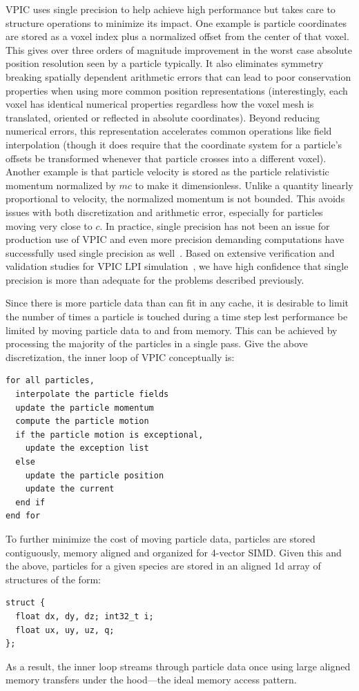 \documentclass[journal,twoside]{IEEEtran}
\begin{document}
VPIC uses single precision to help achieve high performance but takes
care to structure operations to minimize its impact.  One example is
particle coordinates are stored as a voxel index plus a normalized
offset from the center of that voxel.  This gives over three orders of
magnitude improvement in the worst case absolute position resolution
seen by a particle typically.  It also eliminates symmetry breaking
spatially dependent arithmetic errors that can lead to poor
conservation properties when using more common position
representations (interestingly, each voxel has identical numerical
properties regardless how the voxel mesh is translated, oriented or
reflected in absolute coordinates).  Beyond reducing numerical errors,
this representation accelerates common operations like field
interpolation (though it does require that the coordinate system for a
particle's offsets be transformed whenever that particle crosses into
a different voxel).  Another example is that particle velocity is
stored as the particle relativistic momentum normalized by $mc$ to
make it dimensionless.  Unlike a quantity linearly proportional to
velocity, the normalized momentum is not bounded.  This avoids issues
with both discretization and arithmetic error, especially for
particles moving very close to $c$.  In practice, single precision has
not been an issue for production use of VPIC and even more precision
demanding computations have successfully used single precision as
well~\cite{Bowers_et_al_2006,Langou_et_al_2006,Lippert_et_al_2007}.
Based on extensive verification and validation studies for VPIC LPI
simulation~\cite{Yin_et_al_Phys_Plasmas_2006}, we have high confidence
that single precision is more than adequate for the problems described
previously.

Since there is more particle data than can fit in any cache, it is
desirable to limit the number of times a particle is touched during a
time step lest performance be limited by moving particle data to and
from memory.  This can be achieved by processing the majority of the
particles in a single pass.  Give the above discretization, the inner
loop of VPIC conceptually is:
\begin{verbatim}
for all particles,
  interpolate the particle fields
  update the particle momentum
  compute the particle motion
  if the particle motion is exceptional,
    update the exception list
  else
    update the particle position
    update the current
  end if
end for
\end{verbatim}
To further minimize the cost of moving particle data, particles are
stored contiguously, memory aligned and organized for 4-vector SIMD.
Given this and the above, particles for a given species are stored in
an aligned 1d array of structures of the form:
\begin{verbatim}
struct {
  float dx, dy, dz; int32_t i;
  float ux, uy, uz, q;
};
\end{verbatim}
As a result, the inner loop streams through particle data once using
large aligned memory transfers under the hood---the ideal memory
access pattern.
\end{document}
